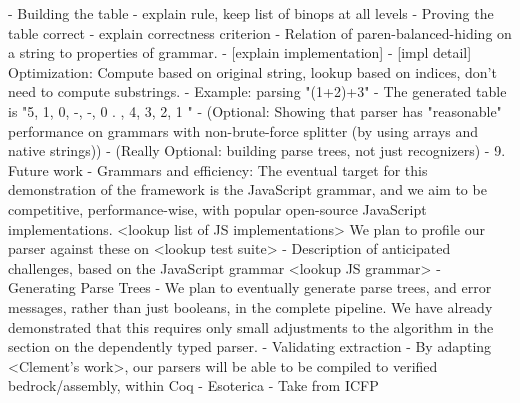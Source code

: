     - Building the table
      - explain rule, keep list of binops at all levels
    - Proving the table correct
      - explain correctness criterion
      - Relation of paren-balanced-hiding on a string to properties of grammar.
  - [explain implementation]
  - [impl detail] Optimization: Compute based on original string, lookup based on indices, don't need to compute substrings.
  - Example: parsing "(1+2)+3"
    - The generated table is
      "5, 1, 0, -, -, 0 .
        , 4, 3, 2, 1
      "
- (Optional: Showing that parser has "reasonable" performance on grammars with non-brute-force splitter (by using arrays and native strings))
- (Really Optional: building parse trees, not just recognizers)
- 9. Future work
  - Grammars and efficiency: The eventual target for this demonstration of the framework is the JavaScript grammar, and we aim to be competitive, performance-wise, with popular open-source JavaScript implementations. <lookup list of JS implementations>  We plan to profile our parser against these on <lookup test suite>
    - Description of anticipated challenges, based on the JavaScript grammar <lookup JS grammar>
  - Generating Parse Trees
    - We plan to eventually generate parse trees, and error messages, rather than just booleans, in the complete pipeline.  We have already demonstrated that this requires only small adjustments to the algorithm in the section on the dependently typed parser.
  - Validating extraction
    - By adapting <Clement's work>, our parsers will be able to be compiled to verified bedrock/assembly, within Coq
  - Esoterica
    - Take from ICFP


